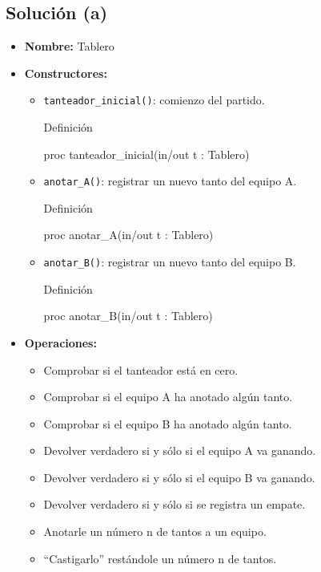 \subsection{Solución (a)}
\begin{itemize}
    \item \textbf{Nombre:} Tablero
    \item \textbf{Constructores:}
    \begin{itemize}
        \item \texttt{tanteador\_inicial()}: comienzo del partido.
        \begin{codebox}{Definición}
            \begin{pascallike}
                proc tanteador_inicial(in/out t : Tablero)
            \end{pascallike}    
        \end{codebox}
        \item \texttt{anotar\_A()}: registrar un nuevo tanto del equipo A.
        \begin{codebox}{Definición}
            \begin{pascallike}
                proc anotar_A(in/out t : Tablero)
            \end{pascallike}
        \end{codebox}
        \item \texttt{anotar\_B()}: registrar un nuevo tanto del equipo B.
        \begin{codebox}{Definición}
            \begin{pascallike}
                proc anotar_B(in/out t : Tablero)
            \end{pascallike}
        \end{codebox}
    \end{itemize}
    \item \textbf{Operaciones:}
    \begin{itemize}
        \item Comprobar si el tanteador está en cero.
        \item Comprobar si el equipo A ha anotado algún tanto.
        \item Comprobar si el equipo B ha anotado algún tanto.
        \item Devolver verdadero si y sólo si el equipo A va ganando.
        \item Devolver verdadero si y sólo si el equipo B va ganando.
        \item Devolver verdadero si y sólo si se registra un empate.
        \item Anotarle un número n de tantos a un equipo.
        \item “Castigarlo” restándole un número n de tantos.
    \end{itemize}
\end{itemize}

